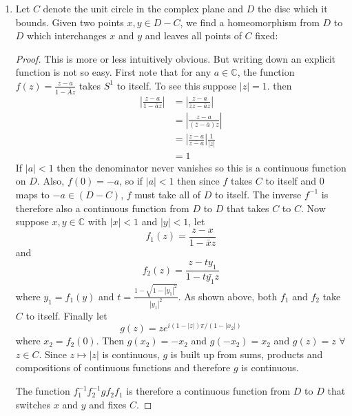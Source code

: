 \documentclass{book}
\begin{document}
\begin{enumerate}
    \item  Let $C$ denote the unit circle in the complex plane and $D$ the disc which it bounds.  Given two points $x,y\in  D-C$, we find a homeomorphism from $D$ to $D$ which interchanges $x$ and $y$ and leaves all points of $C$ fixed:
        \begin{proof} This is more or less intuitively obvious.  But writing down an explicit function is not so easy.  First note that for any $a \in \mathbb C$, the function $f(z)=\frac{z-a}{1-\overline{A}z}$ takes $S^1$ to itself.  To see this suppose $|z|=1$.  then
            \begin{align*}
                \left|\frac{z-a}{1-\overline{a}z}\right|&=\left|\frac{z-a}{\overline{z}z-\overline{a}z}\right|\\
                &=\left|\frac{z-a}{(\overline{z}-\overline{a})z}\right|\\
                &=\left|\frac{z-a}{\overline{z-a}}\right|\frac{1}{|z|}\\
                &=1
            \end{align*}
            If $|a|<1$ then the denominator never vanishes so this is a continuous function on $D$.  Also,
            $f(0)=-a$, so if $|a|<1$ then since $f$ takes $C$ to itself and $0$ maps to $-a\in(D-C)$, $f$ must take all of $D$ to itself.  The inverse $f^{-1}$ is therefore also a continuous function from $D$ to $D$ that takes $C$ to $C$.
            Now suppose $x,y\in\mathbb C$ with $|x|<1$ and $|y|<1$, let
            $$f_1(z)=\frac{z-x}{1-\bar xz}$$
            and
            $$f_2(z)=\frac{z-ty_1}{1-t\bar{y_1}z}$$
            where $y_1=f_1(y)$ and $t=\frac{1-\sqrt{1-|y_1|^2}}{|y_1|^2}$. 
            As shown above, both $f_1$ and $f_2$ take $C$ to itself. 
            Finally let
            $$g(z)=ze^{i(1-|z|)\pi/(1-|x_2|)}$$
            where $x_2=f_2(0)$.
            Then $g(x_2)=-x_2$ and $g(-x_2)=x_2$ and $g(z)=z$ $\forall$ $z\in C$.  Since $z\mapsto|z|$ is continuous, $g$ is built up from sums, products and compositions of continuous functions and therefore $g$ is continuous.
            \par The function $f_1^{-1}f_2^{-1}gf_2f_1$ is therefore a continuous function from $D$ to $D$ that switches $x$ and $y$ and fixes $C$.
        \end{proof}


\end{enumerate}
\end{document}
